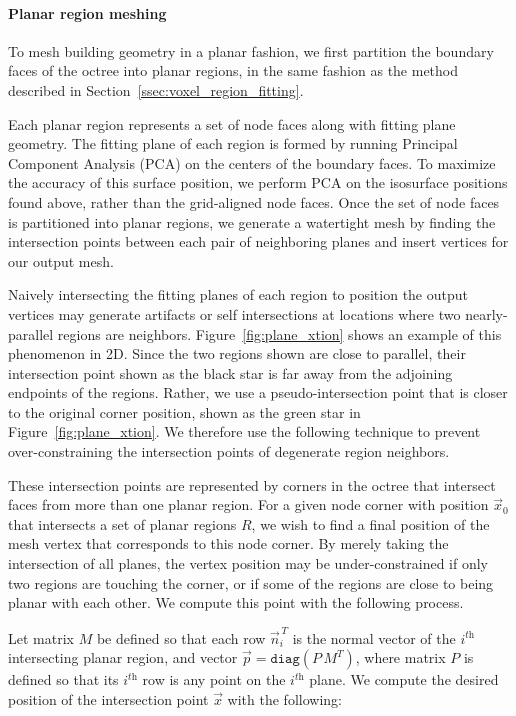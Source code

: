 \documentclass[12pt,onecolumn,oneside]{book}
\begin{document}
\paragraph*{Planar region meshing}
To mesh building geometry in a planar fashion, we first partition the boundary faces of the octree into planar regions, in the same fashion as the method described in Section~\ref{ssec:voxel_region_fitting}.  

Each planar region represents a set of node faces along with fitting plane geometry.  The fitting plane of each region is formed by running Principal Component Analysis (PCA) on the centers of the boundary faces.  To maximize the accuracy of this surface position, we perform PCA on the isosurface positions found above, rather than the grid-aligned node faces.  Once the set of node faces is partitioned into planar regions, we generate a watertight mesh by finding the intersection points between each pair of neighboring planes and insert vertices for our output mesh.  

Naively intersecting the fitting planes of each region to position the output vertices may generate artifacts or self intersections at locations where two nearly-parallel regions are neighbors.  Figure~\ref{fig:plane_xtion} shows an example of this phenomenon in 2D.  Since the two regions shown are close to parallel, their intersection point shown as the black star is far away from the adjoining endpoints of the regions.  Rather, we use a pseudo-intersection point that is closer to the original corner position, shown as the green star in Figure~\ref{fig:plane_xtion}.  We therefore use the following technique to prevent over-constraining the intersection points of degenerate region neighbors.

These intersection points are represented by corners in the octree that intersect faces from more than one planar region.  For a given node corner with position $\vec{x}_0$ that intersects a set of planar regions $R$, we wish to find a final position of the mesh vertex that corresponds to this node corner.  By merely taking the intersection of all planes, the vertex position may be under-constrained if only two regions are touching the corner, or if some of the regions are close to being planar with each other.  
We compute this point with the following process.

Let matrix $M$ be defined so that each row $\vec{n}_i^{\,T}$ is the normal vector of the $i^{\textit{th}}$ intersecting planar region, and vector $\vec{p} = \texttt{diag}(P\,M^T)$, where matrix $P$ is defined so that its $i^{\textit{th}}$ row is any point on the $i^{\textit{th}}$ plane.  We compute the desired position of the intersection point $\vec{x}$ with the following:
\end{document}
